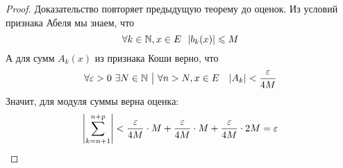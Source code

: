 \begin{proof}
	Доказательство повторяет предыдущую теорему до оценок. Из условий признака Абеля мы знаем, что
	\[
		\forall k \in \mathbb{N}, x \in E\ \ |b_k(x)| \leqslant M
	\]
	А для сумм $A_k(x)$ из признака Коши верно, что
	\[
		\forall \varepsilon > 0\ \exists N \in \mathbb{N} \ \big|\  \forall n > N, x \in E \quad |A_k| < \frac{\varepsilon}{4M}
	\]
	Значит, для модуля суммы верна оценка:
	\[
		\left|\sum\limits_{k = n + 1}^{n + p}\right| < \frac{\varepsilon}{4M} \cdot M + \frac{\varepsilon}{4M} \cdot M + \frac{\varepsilon}{4M} \cdot 2M = \varepsilon
	\]
\end{proof}
